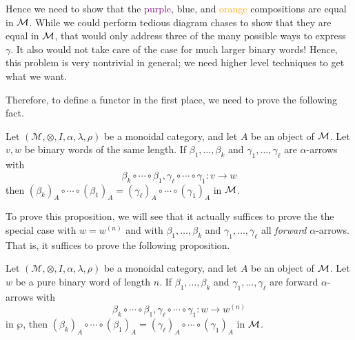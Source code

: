 \begin{example}
\begin{center}
\end{center}
Hence we need to show that the \textcolor{Purple}{purple}, \textcolor{NavyBlue}{blue}, and \textcolor{Orange}{orange} compositions
are equal in $\mathcal{M}$. While we could perform tedious diagram chases to show that they  are 
equal in $\mathcal{M}$, that would only address three of the many possible ways to express 
$\gamma$. It also would not take care of the case for much larger binary words! 
Hence, this problem is very nontrivial in general; we need higher level techniques to get 
what we want. 
\end{example}

Therefore, to define a functor in the first place, we need to prove the following 
fact. 

\begin{proposition}\label{proposition:parallel_in_M_are_equal}
    Let $(\mathcal{M}, \otimes, I, \alpha, \lambda, \rho)$ be a monoidal category, 
    and let $A$ be an object of $\mathcal{M}$. Let $v,w$ be binary words of the same length.
    If $\beta_1, \dots , \beta_k$ and $\gamma_1, \dots , \gamma_{\ell}$ are 
    $\alpha$-arrows with 
    \[
        \beta_k \circ \cdots \circ \beta_1,
        \gamma_{\ell} \circ \cdots \circ \gamma_1: v \to w
    \]
    then $(\beta_k)_A  \circ \cdots \circ (\beta_1)_A
    = (\gamma_{\ell})_A \circ \cdots \circ (\gamma_1)_A$ in $\mathcal{M}$.
\end{proposition}

To prove this proposition, we will see that it actually suffices to prove 
the the special case with $w = w^{(n)}$ and with $\beta_1, \dots , \beta_{k}$ and $\gamma_1, \dots , \gamma_{\ell}$
all \emph{forward} $\alpha$-arrows. That is, it suffices to prove the following proposition. 

\begin{proposition}\label{proposition:parallel_w_to_wn_equal_in_M}
    Let $(\mathcal{M}, \otimes, I, \alpha, \lambda, \rho)$ be a monoidal category, 
    and let $A$ be an object of $\mathcal{M}$. Let $w$ be a pure binary word of length $n$.
    If $\beta_1, \dots , \beta_k$ and $\gamma_1, \dots , \gamma_{\ell}$ are 
    forward $\alpha$-arrows with 
    \[
        \beta_k \circ \cdots \circ \beta_1,
        \gamma_{\ell} \circ \cdots \circ \gamma_1: w \to w^{(n)}
    \]
    in $\wp$, then $(\beta_k)_A  \circ \cdots \circ (\beta_1)_A
    = (\gamma_{\ell})_A \circ \cdots \circ (\gamma_1)_A$ in $\mathcal{M}$.
\end{proposition}


